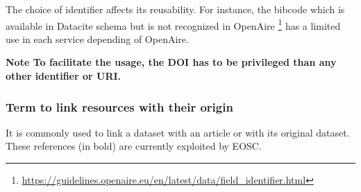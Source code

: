 \documentclass[11pt,a4paper]{ivoa}
\newcommand{\important}[1]{\textbf{\color{ivoacolor}Note #1 \\ }}
\begin{document}
The choice of identifier affects its reusability. For instance, the bibcode which is available in Datacite schema but is not recognized in OpenAire \footnote{\url{https://guidelines.openaire.eu/en/latest/data/field_identifier.html}} has a limited use in each service depending of OpenAire.

\important{To facilitate the usage, the DOI has to be privileged than any other identifier or URI.}


\subsubsection{Term to link resources with their origin}
\hypertarget{term_to_link_resources_with_their_origin}{}\label{sec:term_to_link_resources_with_their_origin}
It is commonly used to link a dataset with an article or with its original dataset. These references (in bold) are currently exploited by EOSC.
\end{document}
